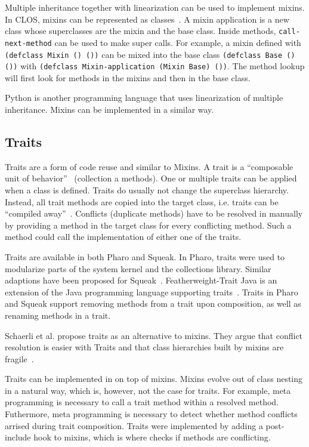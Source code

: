 Multiple inheritance together with linearization can be used to implement mixins. In CLOS, mixins can be represented as classes~\cite{Smaragdakis:1998:ILD:646155.679703}. A mixin application is a new class whose superclasses are the mixin and the base class. Inside methods, \texttt{call-next-method} can be used to make super calls. For example, a mixin defined with \texttt{(defclass Mixin () ())} can be mixed into the base class \texttt{(defclass Base () ())} with \texttt{(defclass Mixin-application (Mixin Base) ())}. The method lookup will first look for methods in the mixins and then in the base class.

Python is another programming language that uses linearization of multiple inheritance. Mixins can be implemented in a similar way.


\subsection{Traits}
\label{sec:rel_traits}
Traits are a form of code reuse and similar to Mixins. A trait is a ``composable unit of behavior''~\cite{traitsschaerli} (collection a methods). One or multiple traits can be applied when a class is defined. Traits do usually not change the superclass hierarchy. Instead, all trait methods are copied into the target class, i.e. traits can be ``compiled away''~\cite{Nierstrasz06flatteningtraits}. Conflicts (duplicate methods) have to be resolved in manually by providing a method in the target class for every conflicting method. Such a method could call the implementation of either one of the traits.

Traits are available in both Pharo and Squeak. In Pharo, traits were used to modularize parts of the system kernel and the collections library. Similar adaptions have been proposed for Squeak~\cite{PHDschaerli}. Featherweight-Trait Java is an extension of the Java programming language supporting traits~\cite{Nierstrasz06flatteningtraits}. Traits in Pharo and Squeak support removing methods from a trait upon composition, as well as renaming methods in a trait.

Schaerli et al. propose traits as an alternative to mixins. They argue that conflict resolution is easier with Traits and that class hierarchies built by mixins are fragile~\cite{Schaerli_classes_is}.

Traits can be implemented in \msname on top of mixins. Mixins evolve out of class nesting in a natural way, which is, however, not the case for traits. For example, meta programming is necessary to call a trait method within a resolved method. Futhermore, meta programming is necessary to detect whether method conflicts arrised during trait composition. Traits were implemented by adding a post-include hook to mixins, which is where \msname checks if methods are conflicting. 

